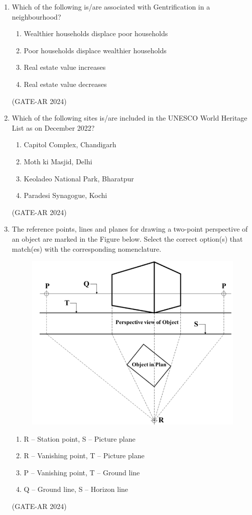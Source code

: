 \documentclass[a4paper,10pt]{article}
\begin{document}
\begin{enumerate}
    \item Which of the following is/are associated with Gentrification in a neighbourhood?
    \begin{enumerate}
        \item Wealthier households displace poor households
        \item Poor households displace wealthier households
        \item Real estate value increases
        \item Real estate value decreases
    \end{enumerate}
    \hfill (GATE-AR 2024)

    \item Which of the following sites is/are included in the UNESCO World Heritage List as on December 2022?
    \begin{enumerate}
        \item Capitol Complex, Chandigarh
        \item Moth ki Masjid, Delhi
        \item Keoladeo National Park, Bharatpur
        \item Paradesi Synagogue, Kochi
    \end{enumerate}
    \hfill (GATE-AR 2024)

\newpage

    \item The reference points, lines and planes for drawing a two-point perspective of an object are marked in the Figure below. Select the correct option(s) that match(es) with the corresponding nomenclature.
    \begin{figure}[h!]
    \centering
    \includegraphics[width=0.5\columnwidth]{figs/09.jpg}
    \caption{}
    \label{fig:Img09}
    \end{figure}
    \begin{enumerate}
        \item R – Station point, S – Picture plane
        \item R – Vanishing point, T – Picture plane
        \item P – Vanishing point, T – Ground line
        \item Q – Ground line, S – Horizon line
    \end{enumerate}
    \hfill (GATE-AR 2024)


\end{enumerate}
\end{document}
